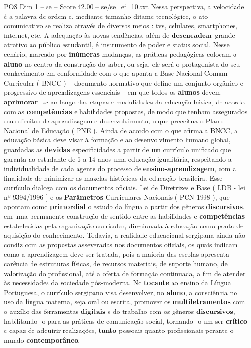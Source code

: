 \begin{textsample}{POS Dim 1 – se – Score 42.00 – se/se\_ef\_10.txt}
Nessa perspectiva, a velocidade é a palavra de ordem e, mediante tamanho ditame tecnológico, o ato comunicativo se realiza através de diversos meios : tvs, celulares, smartphones, internet, etc.
A adequação às novas tendências, além de \textbf{desencadear} grande atrativo ao público estudantil, é instrumento de poder e status social.
Nesse cenário, marcado por \textbf{inúmeras} mudanças, as práticas pedagógicas colocam o \textbf{aluno} no centro da construção do saber, ou seja, ele será o protagonista do seu conhecimento em conformidade com o que aponta a Base Nacional Comum Curricular ( BNCC ) – documento normativo que define um conjunto orgânico e progressivo de aprendizagens essenciais – em que todos os \textbf{alunos} devem \textbf{aprimorar} -se ao longo das etapas e modalidades da educação básica, de acordo com as \textbf{competências} e habilidades propostas, de modo que tenham assegurados seus direitos de aprendizagem e desenvolvimento, o que preceitua o Plano Nacional de Educação ( PNE ).
Ainda de acordo com o que afirma a BNCC, a educação básica deve visar à formação e ao desenvolvimento humano global, guardadas as \textbf{devidas} especificidades a partir de um currículo unificado que garanta ao estudante de 6 a 14 anos uma educação igualitária, respeitando a individualidade de cada agente do processo de \textbf{ensino-aprendizagem}, com a finalidade de minimizar as mazelas históricas da educação brasileira.
Esse currículo dialoga com os documentos oficiais, Lei de Diretrizes e Base ( LDB - lei nº 9394/1996 ) e os \textbf{Parâmetros} Curriculares Nacionais ( PCN 1998 ), que apontam como \textbf{primordial} o estudo da língua a partir dos gêneros \textbf{discursivos}, em uma permanente construção de sentido entre as habilidades e \textbf{competências} estabelecidas pela organização curricular, direcionada à educação como ponto de aquisição do conhecimento.
Todavia, a realidade educacional sergipana ainda não condiz com as propostas asseveradas nos documentos oficiais, os quais indicam como a aprendizagem deve ser tratada, pois a maioria das escolas apresenta carência de estruturas físicas, de recursos materiais, de suporte humano, de valorização do profissional, até a oferta de formação continuada, a fim de atender às necessidades da sociedade pós-moderna.
No \textbf{tocante} ao ensino da Língua Portuguesa, o currículo sergipano visa desenvolver, no \textbf{aluno}, a consciência no uso da língua materna, seja oral ou escrita, promover os \textbf{multiletramentos} com o auxílio das ferramentas \textbf{digitais} e do trabalho com os gêneros \textbf{discursivos}, habilitando -o para as práticas de comunicação social, tornando -o um ser \textbf{crítico} e capaz de adquirir realizações, \textbf{tanto} pessoais quanto profissionais perante o mundo \textbf{contemporâneo}.

\end{textsample}
